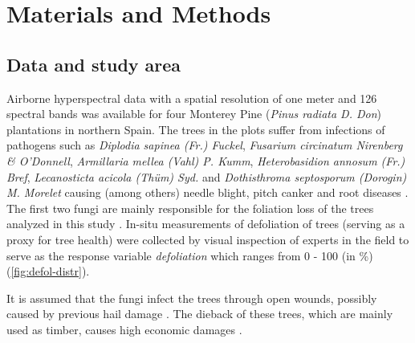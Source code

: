 \documentclass[remotesensing,article,submit,moreauthors,pdftex]{Definitions/mdpi}
\begin{document}
\section{Materials and Methods}

\subsection{Data and study area}

Airborne hyperspectral data with a spatial resolution of one meter and 126 spectral bands was available for four Monterey Pine (\textit{Pinus radiata D. Don}) plantations in northern Spain.
The trees in the plots suffer from infections of pathogens such as \textit{Diplodia sapinea (Fr.) Fuckel}, \textit{Fusarium circinatum Nirenberg \& O'Donnell}, \textit{Armillaria mellea (Vahl) P. Kumm}, \textit{Heterobasidion annosum (Fr.) Bref}, \textit{Lecanosticta acicola (Thüm) Syd.} and \textit{Dothisthroma septosporum (Dorogin) M. Morelet} causing (among others) needle blight, pitch canker and root diseases \cite{mesanza2016, iturritxa2017}.
The first two fungi are mainly responsible for the foliation loss of the trees analyzed in this study \cite{iturritxa2014}.
In-situ measurements of defoliation of trees (serving as a proxy for tree health) were collected by visual inspection of experts in the field to serve as the response variable \textit{defoliation} which ranges from 0 - 100 (in \%) (\autoref{fig:defol-distr}).

It is assumed that the fungi infect the trees through open wounds, possibly caused by previous hail damage \cite{iturritxa2014}.
The dieback of these trees, which are mainly used as timber, causes high economic damages \cite{ganley2009}.
\end{document}
